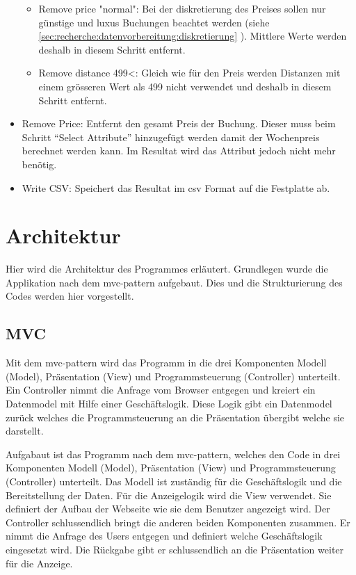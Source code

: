 \begin{itemize}
\begin{itemize}
			\item Remove price "normal": Bei der diskretierung des Preises sollen nur günstige und luxus Buchungen beachtet werden (siehe \cref{sec:recherche:datenvorbereitung:diskretierung} ). Mittlere Werte werden deshalb in diesem Schritt entfernt.
			\item Remove distance 499<: Gleich wie für den Preis werden Distanzen mit einem grösseren Wert als 499 nicht verwendet und deshalb in diesem Schritt entfernt.
 		\end{itemize}
 	\item Remove Price: Entfernt den gesamt Preis der Buchung. Dieser muss beim Schritt "`Select Attribute"' hinzugefügt werden damit der Wochenpreis berechnet werden kann. Im Resultat wird das Attribut jedoch nicht mehr benötig.
 	\item Write CSV: Speichert das Resultat im \gls{csv} Format auf die Festplatte ab.
 \end{itemize}

\section{Architektur}
\label{sec:proofofconcept:architektur}
Hier wird die Architektur des Programmes erläutert. Grundlegen wurde die Applikation nach dem \gls{mvc}-\gls{pattern} aufgebaut. Dies und die Strukturierung des Codes werden hier vorgestellt.

\subsection{MVC}
\label{sec:proofofconcept:architektur:mvc}
Mit dem \gls{mvc}-\gls{pattern} wird das Programm in die drei Komponenten Modell (Model), Präsentation (View) und Programmsteuerung (Controller) unterteilt. Ein Controller nimmt die Anfrage vom Browser entgegen und kreiert ein Datenmodel mit Hilfe einer Geschäftslogik. Diese Logik gibt ein Datenmodel zurück welches die Programmsteuerung an die Präsentation übergibt welche sie darstellt.

Aufgabaut ist das Programm nach dem \gls{mvc}-\gls{pattern}, welches den Code in drei Komponenten Modell (Model), Präsentation (View) und Programmsteuerung (Controller) unterteilt. Das Modell ist zuständig für die Geschäftslogik und die Bereitstellung der Daten. Für die Anzeigelogik wird die View verwendet. Sie definiert der Aufbau der Webseite wie sie dem Benutzer angezeigt wird. Der Controller schlussendlich bringt die anderen beiden Komponenten zusammen. Er nimmt die Anfrage des Users entgegen und definiert welche Geschäftslogik eingesetzt wird. Die Rückgabe gibt er schlussendlich an die Präsentation weiter für die Anzeige.


